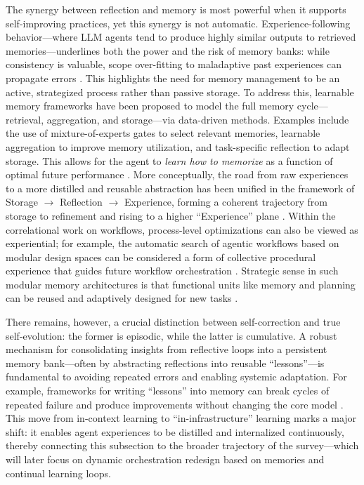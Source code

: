 \documentclass[11pt,a4paper]{article}
\begin{document}
The synergy between reflection and memory is most powerful when it supports self-improving practices, yet this synergy is not automatic. Experience-following behavior---where LLM agents tend to produce highly similar outputs to retrieved memories---underlines both the power and the risk of memory banks: while consistency is valuable, scope over-fitting to maladaptive past experiences can propagate errors \cite{arxiv:2505.16067v2}. This highlights the need for memory management to be an active, strategized process rather than passive storage. To address this, learnable memory frameworks have been proposed to model the full memory cycle---retrieval, aggregation, and storage---via data-driven methods. Examples include the use of mixture-of-experts gates to select relevant memories, learnable aggregation to improve memory utilization, and task-specific reflection to adapt storage. This allows for the agent to \emph{learn how to memorize} as a function of optimal future performance \cite{arxiv:2508.16629v1}. More conceptually, the road from raw experiences to a more distilled and reusable abstraction has been unified in the framework of Storage $\rightarrow$ Reflection $\rightarrow$ Experience, forming a coherent trajectory from storage to refinement and rising to a higher ``Experience'' plane \cite{arxiv:2605.06716v1}. Within the correlational work on workflows, process-level optimizations can also be viewed as experiential; for example, the automatic search of agentic workflows based on modular design spaces can be considered a form of collective procedural experience that guides future workflow orchestration \cite{arxiv:2410.06153v3}. Strategic sense in such modular memory architectures is that functional units like memory and planning can be reused and adaptively designed for new tasks \cite{arxiv:2601.12560v1}.

There remains, however, a crucial distinction between self-correction and true self-evolution: the former is episodic, while the latter is cumulative. A robust mechanism for consolidating insights from reflective loops into a persistent memory bank---often by abstracting reflections into reusable ``lessons''---is fundamental to avoiding repeated errors and enabling systemic adaptation. For example, frameworks for writing ``lessons'' into memory can break cycles of repeated failure and produce improvements without changing the core model \cite{arxiv:2510.02373v1,arxiv:2605.06716v1}. This move from in-context learning to ``in-infrastructure'' learning marks a major shift: it enables agent experiences to be distilled and internalized continuously, thereby connecting this subsection to the broader trajectory of the survey---which will later focus on dynamic orchestration redesign based on memories and continual learning loops.
\end{document}
